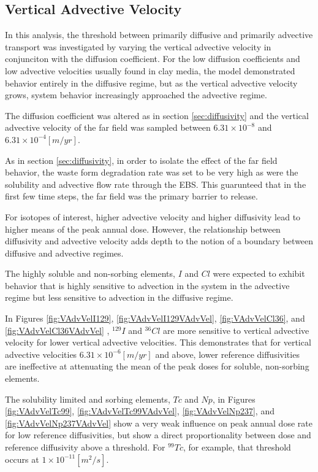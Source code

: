 \subsection{Vertical Advective Velocity}

In this analysis, the threshold between primarily diffusive and primarily 
advective transport was investigated by varying the vertical advective velocity 
in conjunciton with the diffusion coefficient.  For the low 
diffusion coefficients and low advective velocities usually found in clay media, 
the model demonstrated behavior entirely in the diffusive regime, but as the 
vertical advective velocity grows, system behavior 
increasingly approached the advective regime. 

The diffusion coefficient was altered as in section \ref{sec:diffusivity} and 
the vertical advective velocity of the far field was sampled between $ 
6.31\times 10^{-8}$ and $ 6.31\times10^{-4} [m/yr]$. 

As in section \ref{sec:diffusivity}, in order to isolate the effect of the far 
field behavior, the waste form degradation rate was set to be very high as were 
the solubility and advective flow rate through the  \gls{EBS}. This guarunteed 
that in the first few time steps, the far field was the primary barrier to 
release. 

For isotopes of interest, higher advective velocity and higher diffusivity lead to higher 
means of the peak annual dose. However, the relationship between diffusivity and 
advective velocity adds depth to the notion of a boundary between diffusive and 
advective regimes.

The highly soluble and non-sorbing elements, $I$ and $Cl$ 
were expected to exhibit behavior that is highly sensitive 
to advection in the system in the advective regime but less sensitive to 
advection in the diffusive regime.  

In Figures \ref{fig:VAdvVelI129}, \ref{fig:VAdvVelI129VAdvVel}, 
\ref{fig:VAdvVelCl36}, and \ref{fig:VAdvVelCl36VAdvVel} , $^{129}I$ and 
$^{36}Cl$ are more sensitive to vertical advective velocity for lower vertical 
advective velocities. This demonstrates that for vertical advective velocities 
$6.31\times10^{-6}[m/yr]$ and above, lower reference diffusivities are 
ineffective at attenuating the mean of the peak doses for soluble, non-sorbing 
elements. 

The solubility limited and sorbing elements, $Tc$ and $Np$, in Figures 
\ref{fig:VAdvVelTc99}, \ref{fig:VAdvVelTc99VAdvVel}, \ref{fig:VAdvVelNp237}, and 
\ref{fig:VAdvVelNp237VAdvVel} show a very weak influence on peak annual dose 
rate for low reference diffusivities, but show a direct proportionality between 
dose and reference diffusivity above a threshold. For $^{99}Tc$, for example, 
that threshold occurs at $1\times10^{-11}[m^2/s]$. 

